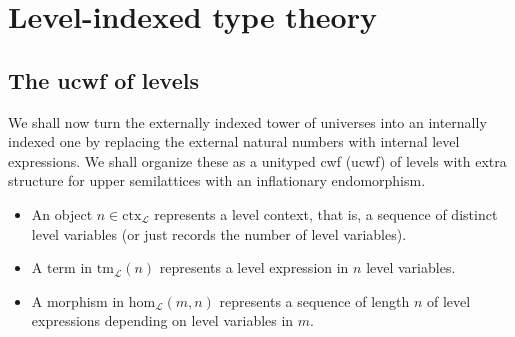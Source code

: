 \documentclass[11pt,a4paper]{article}
\theoremstyle{definition}
\newcommand{\Ctx}{\mathrm{Ctx}}
\newcommand{\Tm}{\mathrm{Tm}}
\def\Ctx{\mathrm{ctx}}
\def\Tm{\mathrm{tm}}
\def\Hom{\mathrm{hom}}
\def\L{{\mathcal{L}}}
\begin{document}
\section{Level-indexed type theory}

\subsection{The ucwf of levels}
We shall now turn the externally indexed tower of universes into an internally indexed one by replacing the external natural numbers with internal level expressions. We shall organize these as a unityped cwf (ucwf) of levels  with extra structure for upper semilattices with an inflationary endomorphism. 
\begin{itemize}
\item 
An object $n \in \Ctx_\L$ represents a level context, that is, a sequence of distinct level variables (or just records the number of level variables). 
\item
A term in $\Tm_\L(n)$ represents a level expression in $n$ level variables.
\item
A morphism in $\Hom_\L(m,n)$ represents a sequence of length $n$ of level expressions depending on level variables in $m$.
\end{itemize}
\end{document}
